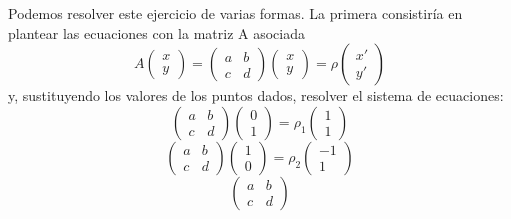 \begin{exa}
	Podemos resolver este ejercicio de varias formas. La primera consistiría en plantear las ecuaciones con la matriz A asociada
	\begin{equation*}
		A\left( \begin{array}{c}
			x\\ y
		\end{array}\right)
		=\left( \begin{array}{cc}
			a&b\\ c&d
		\end{array}\right) 
		\left( \begin{array}{c}
			x\\ y
		\end{array}\right)=\rho
		\left( \begin{array}{c}
		x'\\ y'
	\end{array}\right)
	\end{equation*}
	y, sustituyendo los valores de los puntos dados, resolver el sistema de ecuaciones:
	\begin{equation*}
		\left( \begin{array}{cc}
			a&b\\ c&d
		\end{array}\right) 
		\left( \begin{array}{c}
			0\\ 1
		\end{array}\right)=\rho_1
		\left( \begin{array}{c}
			1\\ 1
		\end{array}\right)
	\end{equation*}
	\begin{equation*}
		\left( \begin{array}{cc}
			a&b\\ c&d
		\end{array}\right) 
		\left( \begin{array}{c}
			1\\ 0
		\end{array}\right)=\rho_2
		\left( \begin{array}{c}
			-1\\ 1
		\end{array}\right)
	\end{equation*}
	\begin{equation*}
		\left( \begin{array}{cc}
			a&b\\ c&d
		\end{array}\right) 

\end{equation*}
\end{exa}
